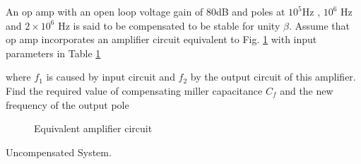 An op amp with an open loop voltage gain of 80dB and poles at $10^{5}$Hz , $10^{6}$ Hz and $2\times10^{6}$ Hz is said to be compensated to be stable for unity $\beta$. Assume that op amp incorporates an amplifier circuit equivalent to Fig. \ref{fig:ee18btech11029_Eqivalent circuit}  with input parameters in Table 	\ref{fig:ee18btech11029_Eqivalent circuit}

where $f_{1}$ is caused by input circuit and $f_{2}$ by the output circuit of this amplifier. Find the required value of compensating miller capacitance $C_f$ and the new frequency of the output pole
\begin{figure}[h!]
	\begin{center}
		\resizebox{\columnwidth/1}{!}{}
	\end{center}
	\caption{Equivalent amplifier circuit}
	\label{fig:ee18btech11029_Eqivalent circuit}
\end{figure}
\begin{table}[!t]
\centering

\caption{Uncompensated System.}
\label{table:ee18btech11029_ Input_Table}
\end{table}
